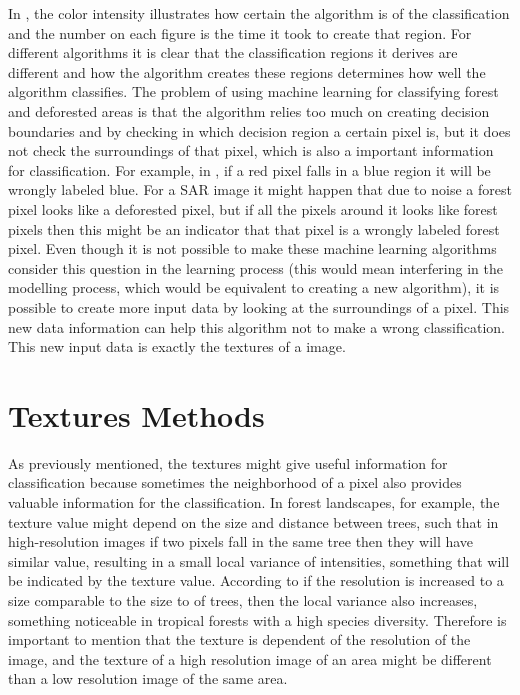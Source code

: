 In , the color intensity illustrates how certain the algorithm is of the classification and the number on each figure is the time it took to create that region.
\newline
For different algorithms it is clear that the classification regions it derives are different and how the algorithm creates these regions determines how well the algorithm classifies.
\newline
The problem of using machine learning for classifying forest and deforested areas is that the algorithm relies too much on creating decision boundaries and by checking in which decision region a certain pixel is, but it does not check the surroundings of that pixel, which is also a important information for classification. \newline
\newline
For example, in , if a red pixel falls in a blue region it will be wrongly labeled blue. For a SAR image it might happen that due to noise a forest pixel looks like a deforested pixel, but if all the pixels around it looks like forest pixels then this might be an indicator that that pixel is a wrongly labeled forest pixel. Even though it is not possible to make these machine learning algorithms consider this question in the learning process (this would mean interfering  in the modelling process, which would be equivalent to creating a new algorithm), it is possible to create more input data by looking at the surroundings of a pixel. This new data information can help this algorithm not to make a wrong classification. This new input data is exactly the textures of a image.

\section{Textures Methods}
\label{sec:Texturization_Methods}
As previously mentioned, the textures might give useful information for classification because sometimes the neighborhood of a pixel also provides valuable information for the classification. In forest landscapes, for example, the texture value might depend on the size and distance between trees, such that in high-resolution images if two pixels fall in the same tree then they will have similar value, resulting in a small local variance of intensities, something that will be indicated by the texture value. According to \cite{Woodcock} if the resolution is increased to a size comparable to the size to of trees, then the local variance also increases, something noticeable in tropical forests with a high species diversity. Therefore is important to mention that the texture is dependent of the resolution of the image, and the texture of a high resolution image of an area might be different than a low resolution image of the same area.

